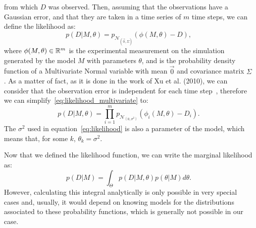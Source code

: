 from which $D$ was observed. Then, assuming that the observations have a 
Gaussian error, and that they are taken in a time series of $m$ time 
steps, we can define the likelihood as:
\begin{equation}
    p (D | M, \theta) = p_{\mathcal{N}_{\left(\vec{0}, \Sigma\right)}}
        (\phi (M,\theta) - D),
\label{eq:likelihood_multivariate}
\end{equation}
where $\phi (M, \theta) \in \mathbb{R}^m$ is the experimental measurement 
on the simulation generated by the model $M$ with parameters $\theta$,
and  is the 
probability density function of a Multivariate Normal variable with mean 
$\vec{0}$ and covariance matrix $\Sigma$. As a matter of fact, as it is
done in the work of Xu et al. (2010), we can consider that the 
observation error is independent for each time step~\cite{Xura20}, 
therefore we can simplify~\ref{eq:likelihood_multivariate} to:
\begin{equation}
    p (D | M, \theta) = \prod_{i = 1}^m p_{\mathcal{N}_{\left(0, 
        \sigma^2\right)}} (\phi_i (M,\theta) - D_i).
\label{eq:likelihood}
\end{equation}
The $\sigma^2$ used in equation~\ref{eq:likelihood} is also a parameter
of the model, which means that, for some $k$, $\theta_k = \sigma^2$.

Now that we defined the likelihood function, we can write the marginal 
likelihood as:
\begin{equation}
    p (D | M) = \int_{\Theta} p (D | M, \theta) p (\theta | M)d\theta.
\label{eq:marginal_likelihood}
\end{equation}
However, calculating this integral analytically is only possible in 
very special cases and, usually, it would depend on knowing models for 
the distributions associated to these probability functions, which is 
generally not possible in our case.

